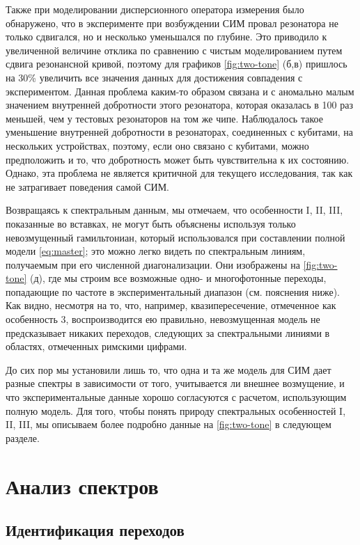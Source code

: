 \documentclass[14pt, a4paper]{extreport}
\numberwithin{equation}{section}
\begin{document}
Также при моделировании дисперсионного оператора измерения было обнаружено, что в эксперименте при возбуждении СИМ провал резонатора не только сдвигался, но и несколько уменьшался по глубине. Это приводило к увеличенной величине отклика по сравнению с чистым моделированием путем сдвига резонансной кривой, поэтому для графиков \autoref{fig:two-tone} (б,в) пришлось на 30\% увеличить все значения данных для достижения совпадения с экспериментом. Данная проблема каким-то образом связана и с аномально малым значением внутренней добротности этого резонатора, которая оказалась в 100 раз меньшей, чем у тестовых резонаторов на том же чипе. Наблюдалось такое уменьшение внутренней добротности в резонаторах, соединенных с кубитами, на нескольких устройствах, поэтому, если оно связано с кубитами, можно предположить и то, что добротность может быть чувствительна к их состоянию. Однако, эта проблема не является критичной для текущего исследования, так как не затрагивает поведения самой СИМ.

Возвращаясь к спектральным данным, мы отмечаем, что особенности I, II, III, показанные во вставках, не могут быть объяснены используя только невозмущенный гамильтониан, который использовался при составлении полной модели \eqref{eq:master}; это можно легко видеть по спектральным линиям, получаемым при его численной диагонализации. Они изображены на \autoref{fig:two-tone} (д), где мы строим все возможные одно- и многофотонные переходы, попадающие по частоте в экспериментальный диапазон (см. пояснения ниже). Как видно, несмотря на то, что, например, квазипересечение, отмеченное как особенность 3, воспроизводится ею правильно, невозмущенная модель не предсказывает никаких переходов, следующих за спектральными линиями в областях, отмеченных римскими цифрами.

До сих пор мы установили лишь то, что одна и та же модель для СИМ дает разные спектры в зависимости от того, учитывается ли внешнее возмущение, и что экспериментальные данные хорошо согласуются с расчетом, использующим полную модель. Для того, чтобы понять природу спектральных особенностей I, II, III, мы описываем более подробно данные на \autoref{fig:two-tone} в следующем разделе.

\section{Анализ спектров}

\subsection{Идентификация переходов}
\end{document}
